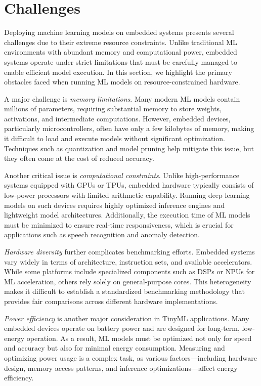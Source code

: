 \documentclass[conference]{IEEEtran}
\begin{document}
\section{Challenges}

Deploying machine learning models on embedded systems presents several challenges due to their extreme resource constraints. Unlike traditional ML environments with abundant memory and computational power, embedded systems operate under strict limitations that must be carefully managed to enable efficient model execution. In this section, we highlight the primary obstacles faced when running ML models on resource-constrained hardware.

A major challenge is \textit{memory limitations}. Many modern ML models contain millions of parameters, requiring substantial memory to store weights, activations, and intermediate computations. However, embedded devices, particularly microcontrollers, often have only a few kilobytes of memory, making it difficult to load and execute models without significant optimization. Techniques such as quantization and model pruning help mitigate this issue, but they often come at the cost of reduced accuracy.

Another critical issue is \textit{computational constraints}. Unlike high-performance systems equipped with GPUs or TPUs, embedded hardware typically consists of low-power processors with limited arithmetic capability. Running deep learning models on such devices requires highly optimized inference engines and lightweight model architectures. Additionally, the execution time of ML models must be minimized to ensure real-time responsiveness, which is crucial for applications such as speech recognition and anomaly detection.

\textit{Hardware diversity} further complicates benchmarking efforts. Embedded systems vary widely in terms of architecture, instruction sets, and available accelerators. While some platforms include specialized components such as DSPs or NPUs for ML acceleration, others rely solely on general-purpose cores. This heterogeneity makes it difficult to establish a standardized benchmarking methodology that provides fair comparisons across different hardware implementations.

\textit{Power efficiency} is another major consideration in TinyML applications. Many embedded devices operate on battery power and are designed for long-term, low-energy operation. As a result, ML models must be optimized not only for speed and accuracy but also for minimal energy consumption. Measuring and optimizing power usage is a complex task, as various factors—including hardware design, memory access patterns, and inference optimizations—affect energy efficiency.
\end{document}
